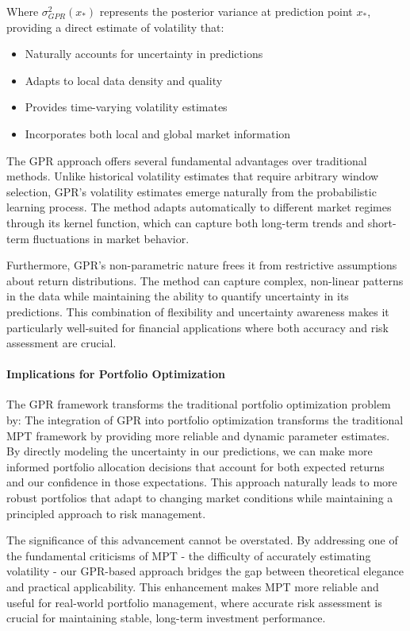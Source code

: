 Where $\sigma_{GPR}^2(x_*)$ represents the posterior variance at prediction point $x_*$, providing a direct estimate of volatility that:

\begin{itemize}
    \item Naturally accounts for uncertainty in predictions
    \item Adapts to local data density and quality
    \item Provides time-varying volatility estimates
    \item Incorporates both local and global market information
\end{itemize}

The \ac{GPR} approach offers several fundamental advantages over traditional methods. Unlike historical volatility estimates that require arbitrary window selection, \ac{GPR}'s volatility estimates emerge naturally from the probabilistic learning process. The method adapts automatically to different market regimes through its kernel function, which can capture both long-term trends and short-term fluctuations in market behavior.

Furthermore, \ac{GPR}'s non-parametric nature frees it from restrictive assumptions about return distributions. The method can capture complex, non-linear patterns in the data while maintaining the ability to quantify uncertainty in its predictions. This combination of flexibility and uncertainty awareness makes it particularly well-suited for financial applications where both accuracy and risk assessment are crucial.


\paragraph{Implications for Portfolio Optimization}
The \ac{GPR} framework transforms the traditional portfolio optimization problem by:
The integration of \ac{GPR} into portfolio optimization transforms the traditional \ac{MPT} framework by providing more reliable and dynamic parameter estimates. By directly modeling the uncertainty in our predictions, we can make more informed portfolio allocation decisions that account for both expected returns and our confidence in those expectations. This approach naturally leads to more robust portfolios that adapt to changing market conditions while maintaining a principled approach to risk management.

The significance of this advancement cannot be overstated. By addressing one of the fundamental criticisms of \ac{MPT} - the difficulty of accurately estimating volatility - our \ac{GPR}-based approach bridges the gap between theoretical elegance and practical applicability. This enhancement makes \ac{MPT} more reliable and useful for real-world portfolio management, where accurate risk assessment is crucial for maintaining stable, long-term investment performance.




